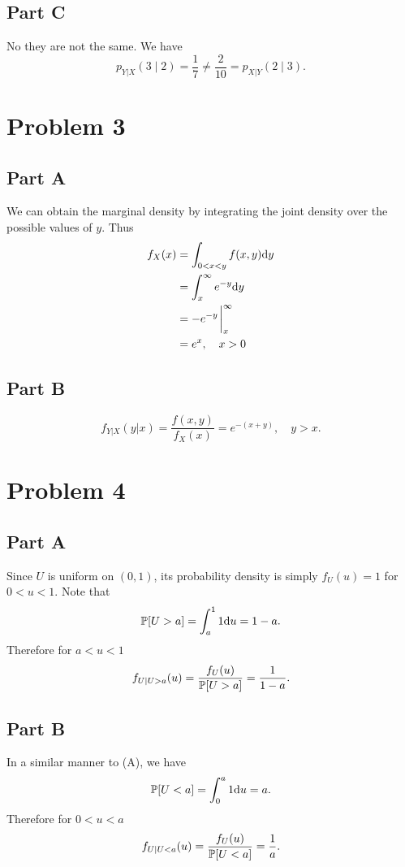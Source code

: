 \documentclass{eeleyes}
\begin{document}
\subsection*{Part C}
No they are not the same. We have
\[
    p_{Y|X}(3 \mid 2) = \frac{1}{7} \neq \frac{2}{10} = p_{X | Y}(2 \mid 3)
.\]

\section*{Problem 3}
\subsection*{Part A}
We can obtain the marginal density by integrating the joint density over the possible values of $y$. Thus
\begin{align*}
    f_X(x) &= \int_{0 < x < y} f(x,y) \dd y \\
           &= \int_{x}^\infty e^{-y} \dd y \\
           &= -e^{-y} \eval_{x}^\infty \\
           &= e^{x}, \quad x > 0
\end{align*}

\subsection*{Part B}
\[
    f_{Y|X}(y | x) = \frac{f(x,y)}{f_X(x)} = e^{-(x+y)}, \quad y > x
.\]

\section*{Problem 4}

\subsection*{Part A}
Since $U$ is uniform on $(0,1)$, its probability density is simply $f_{U}(u) = 1$ for $0 < u < 1$. Note that
\[
    \mathbb{P}\qty[U > a] = \int_a^1 1 \dd u = 1 - a
.\]
Therefore for $a < u < 1$
\[
    f_{U|U > a}(u) = \frac{f_{U}(u)}{\mathbb{P}\qty[U > a]} = \frac{1}{1 - a}
.\]

\subsection*{Part B}
In a similar manner to (A), we have
\[
    \mathbb{P}\qty[U < a] = \int_0^a 1 \dd u = a
.\]
Therefore for $0 < u < a$
\[
    f_{U|U < a}(u) = \frac{f_{U}(u)}{\mathbb{P}\qty[U < a]} = \frac{1}{a}
.\]
\end{document}
